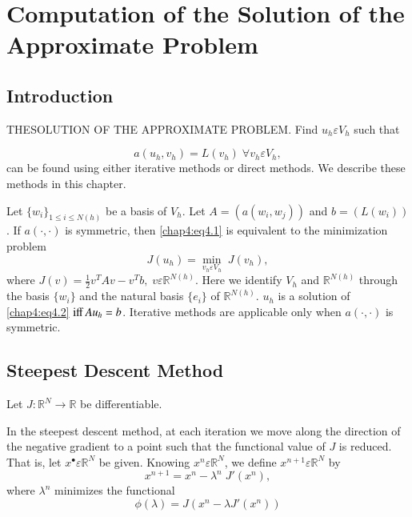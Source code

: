 
\chapter{Computation of the Solution of the Approximate
  Problem}\label{chap4} 

\section{Introduction}\label{chap4:ssec4.1} 

THE\pageoriginale SOLUTION OF THE APPROXIMATE PROBLEM. Find $u_h\varepsilon
V_h$ such that 

\setcounter{equation}{0}
\begin{equation}\label{chap4:eq4.1}
a(u_h, v_h)=L(v_h) \; \forall v_h\varepsilon V_h,
\end{equation}
can be found using either iterative methods or direct methods. We
describe these methods in this chapter.

Let $\{w_i\}_{1\leq i\leq N(h)}$ be a basis of $V_h$. Let $A=(a(w_i,
w_j))$ and $b=(L(w_i))$. If $a(\cdotp,\cdotp)$ is symmetric, then
\eqref{chap4:eq4.1} is equivalent to the minimization problem 
\begin{equation}\label{chap4:eq4.2}
J(u_h)=\min\limits_{v_h\varepsilon V_h}\; J(v_h),
\end{equation}
where $J(v)=\frac{1}{2}v^TAv-v^Tb,\;
v\varepsilon\mathbb{R}^{N(h)}$. Here we identify $V_h$ and
$\mathbb{R}^{N(h)}$ through the basis $\{w_i\}$ and the natural basis
$\{e_i\}$ of $\mathbb{R}^{N(h)}$. $u_h$ is a solution of
\eqref{chap4:eq4.2} $\operatorname{iff} Au_h=b$. Iterative methods are applicable
only when $a(\cdotp,\cdotp)$ is symmetric.

\section{Steepest Descent Method}\label{chap4:ssec4.2}
Let $J:\mathbb{R}^N\to\mathbb{R}$ be differentiable.

In the steepest descent method, at each iteration we move along the
direction of the negative gradient to a point such that the functional
value of $J$ is reduced. That is, let
$x^\bullet\varepsilon\mathbb{R}^N$ be given. Knowing $x^n\varepsilon
\mathbb{R}^N$, we define $x^{n+1}\varepsilon\mathbb{R}^N$ by 
\begin{equation}\label{chap4:eq4.3}
x^{n+1}=x^n-\lambda^n\; J'(x^n),
\end{equation}
where $\lambda^n$ minimizes the functional 
\begin{equation}\label{chap4:eq4.4}
\phi(\lambda)=J\left(x^n-\lambda J'(x^n)\right)
\end{equation}\pageoriginale

